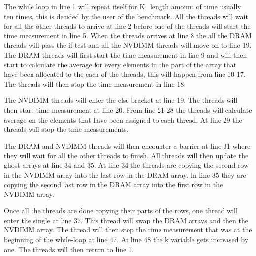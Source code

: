 \documentclass[12pt,a4paper,USenglish]{article}      %
\begin{document}
The while loop in line 1 will repeat itself for K\_length amount of time usually ten times, this is decided by the user of the benchmark. All the threads will wait for all the other threads to arrive at line 2 before one of the threads will start the time measurement in line 5.
When the threads arrives at line 8 the all the DRAM threads will pass the if-test and all the NVDIMM threads will move on to line 19. The DRAM threads will first start the time measurement in line 9 and will then start to calculate the average for every elements in the  part of the array that have been allocated to the each of the threads, this will happen from line 10-17. The threads will then stop the time measurement in line 18.

The NVDIMM threads will enter the else bracket at line 19. The threads will then start time measurement at line 20. From line 21-28 the threads will calculate average on the elements that have been assigned to each thread. At line 29 the threads will stop the time measurements.

The DRAM and NVDIMM threads will then encounter a barrier at line 31 where they will wait for all the other threads to finish. All threads will then update the ghost arrays at line 34 and 35. At line 34 the threads are copying the second row in the NVDIMM array into the last row in the DRAM array. In line 35 they are copying the second last row in the DRAM array into the first row in the NVDIMM array.

Once all the threads are done copying their parts of the rows, one thread will enter the single at line 37. This thread will swap the DRAM arrays and then the NVDIMM array. The thread will then stop the time measurement that was at the beginning of the while-loop at line 47. At line 48 the k variable gets increased by one. The threads will then return to line 1. 
\end{document}
